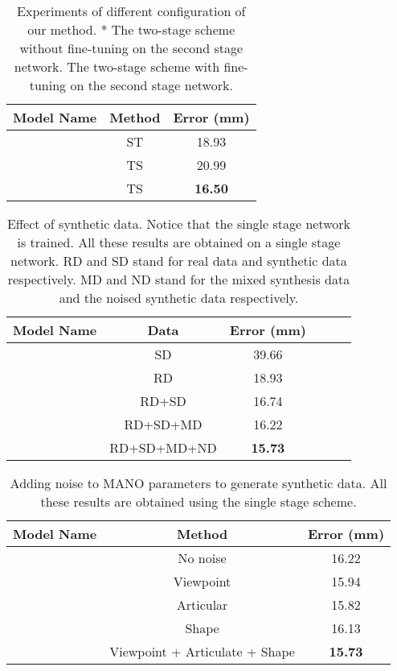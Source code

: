 \documentclass{article}
\begin{document}
\begin{table}[t]
\centering
\begin{tabular}{ccc}
\hline
Model Name & Method & Error (mm) \\ \hline
 & ST & 18.93\\  \hline
 & TS  & 20.99 \\ \hline
 & TS & \textbf{16.50} \\
\hline
\end{tabular}	\caption{\label{tab:ablation_finetune} Experiments of different configuration of our method. * The two-stage scheme without fine-tuning on the second stage network.  The two-stage scheme with fine-tuning on the second stage network.}
\end{table}

\begin{table}[t]
\centering
\begin{tabular}{cccccc}
\hline
Model Name & Data & Error (mm) \\ \hline
 & SD & 39.66 \\ \hline
 & RD & 18.93 \\ \hline
 & RD+SD & 16.74 \\ \hline
 & RD+SD+MD & 16.22 \\ \hline 
 & RD+SD+MD+ND & \textbf{15.73} \\
\hline
\end{tabular}	\caption{\label{tab:systhetic_result} Effect of synthetic data. Notice that the single stage network is trained. All these results are obtained on a single stage network. RD and SD stand for real data and synthetic data respectively. MD and ND stand for the mixed synthesis data and the noised synthetic data respectively.}
\end{table}

\begin{table}[!t] \small
\centering
\begin{tabular}{ccc}
\hline
Model Name & Method & Error (mm) \\ \hline
 & No noise & 16.22 \\
 & Viewpoint & 15.94 \\
 & Articular & 15.82 \\
 & Shape & 16.13 \\
 & Viewpoint + Articulate + Shape & \textbf{15.73} \\
\hline
\end{tabular}	\caption{\label{tab:add_noise_result}  Adding noise to MANO parameters to generate synthetic data. All these results are obtained using the single stage scheme.}
\end{table}
\end{document}
